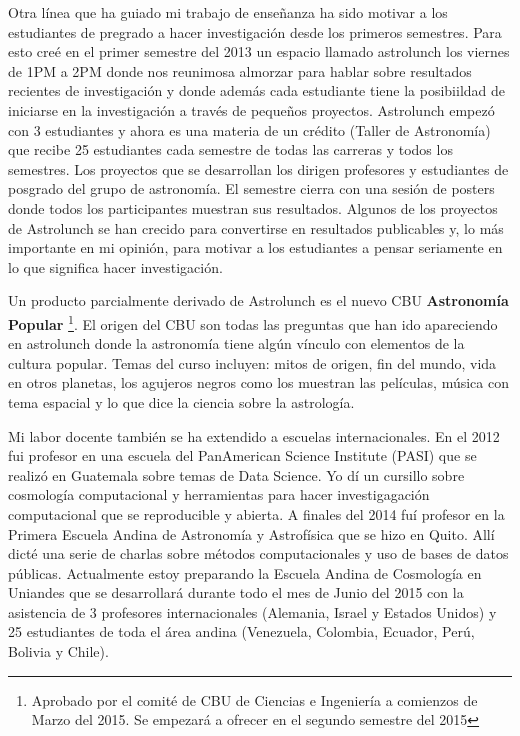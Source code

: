 Otra línea que ha guiado mi trabajo de enseñanza ha sido motivar a los estudiantes
de pregrado a hacer investigación desde los primeros semestres. Para
esto creé en el primer semestre del 2013 un espacio llamado astrolunch
los viernes de 1PM a 2PM donde nos reunimosa almorzar para hablar
sobre resultados recientes de investigación y donde además cada
estudiante tiene la posibiildad de iniciarse en la investigación a
través de pequeños proyectos. Astrolunch empezó con 3 estudiantes y
ahora es una materia de un crédito (Taller de Astronomía) que recibe
25 estudiantes cada semestre de todas las carreras y todos los
semestres. Los proyectos que se desarrollan los dirigen profesores y
estudiantes de posgrado del grupo de astronomía. El semestre cierra
con una sesi\'on de posters donde todos los participantes muestran sus
resultados. Algunos de los
proyectos de Astrolunch se han crecido para convertirse en resultados
publicables y, lo más importante en mi opinión, para motivar a los
estudiantes a pensar seriamente en lo que significa hacer investigación.


Un producto parcialmente derivado de Astrolunch es el nuevo CBU {\bf Astronomía
Popular} \footnote{Aprobado por el comit\'e de CBU de Ciencias e
  Ingenier\'ia a comienzos de Marzo del 2015. Se empezar\'a a ofrecer
  en el segundo semestre del 2015}. El origen del CBU son todas las
preguntas que han ido apareciendo en astrolunch donde la astronom\'ia
tiene alg\'un v\'inculo con elementos de la cultura popular. Temas del
curso incluyen: mitos de origen, fin del mundo, vida en otros planetas,
los agujeros negros como los muestran las películas, música con tema
espacial y lo que dice la ciencia sobre la astrología.

Mi labor docente también se ha extendido a escuelas
internacionales. En el 2012 fui profesor en una escuela del
PanAmerican Science Institute (PASI) que se realizó en Guatemala sobre
temas de Data Science. Yo dí un cursillo sobre cosmología
computacional y herramientas para hacer investigagación computacional
que se reproducible y abierta. A finales del 2014 fuí profesor en la
Primera Escuela Andina de Astronomía y Astrofísica que se hizo en
Quito. Allí dicté una serie de charlas sobre métodos computacionales y
uso de bases de datos públicas. Actualmente estoy preparando la
Escuela Andina de Cosmología en Uniandes que se desarrollará durante
todo el mes de Junio del 2015 con la asistencia de 3 profesores
internacionales (Alemania, Israel y Estados Unidos) y 25 estudiantes
de toda el área andina (Venezuela, Colombia, Ecuador, Perú, Bolivia y
Chile). 



